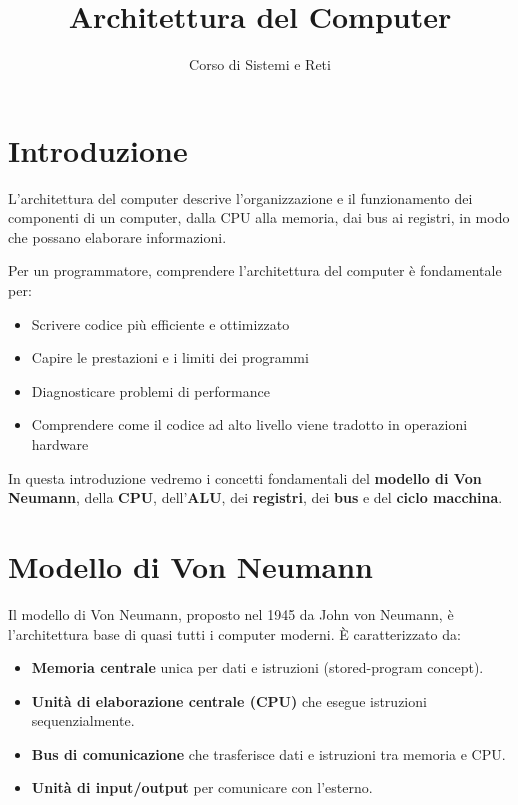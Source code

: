 \documentclass[12pt,a4paper]{article}
\title{Architettura del Computer}
\author{Corso di Sistemi e Reti}
\begin{document}
\maketitle

\tableofcontents
\newpage

\section{Introduzione}
L'architettura del computer descrive l'organizzazione e il funzionamento dei componenti di un computer, dalla CPU alla memoria, dai bus ai registri, in modo che possano elaborare informazioni. 

Per un programmatore, comprendere l'architettura del computer è fondamentale per:
\begin{itemize}
    \item Scrivere codice più efficiente e ottimizzato
    \item Capire le prestazioni e i limiti dei programmi
    \item Diagnosticare problemi di performance
    \item Comprendere come il codice ad alto livello viene tradotto in operazioni hardware
\end{itemize}

In questa introduzione vedremo i concetti fondamentali del \textbf{modello di Von Neumann}, della \textbf{CPU}, dell'\textbf{ALU}, dei \textbf{registri}, dei \textbf{bus} e del \textbf{ciclo macchina}.

\section{Modello di Von Neumann}
Il modello di Von Neumann, proposto nel 1945 da John von Neumann, è l'architettura base di quasi tutti i computer moderni. È caratterizzato da:
\begin{itemize}
    \item \textbf{Memoria centrale} unica per dati e istruzioni (stored-program concept).
    \item \textbf{Unità di elaborazione centrale (CPU)} che esegue istruzioni sequenzialmente.
    \item \textbf{Bus di comunicazione} che trasferisce dati e istruzioni tra memoria e CPU.
    \item \textbf{Unità di input/output} per comunicare con l'esterno.
\end{itemize}
\end{document}
